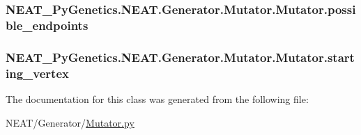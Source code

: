 \subsubsection[{\texorpdfstring{possible\+\_\+endpoints}{possible_endpoints}}]{\setlength{\rightskip}{0pt plus 5cm}N\+E\+A\+T\+\_\+\+Py\+Genetics.\+N\+E\+A\+T.\+Generator.\+Mutator.\+Mutator.\+possible\+\_\+endpoints\hspace{0.3cm}{\ttfamily [static]}}\hypertarget{classNEAT__PyGenetics_1_1NEAT_1_1Generator_1_1Mutator_1_1Mutator_add17af09898bf2a4203fed77bc404161}{}\label{classNEAT__PyGenetics_1_1NEAT_1_1Generator_1_1Mutator_1_1Mutator_add17af09898bf2a4203fed77bc404161}
\subsubsection[{\texorpdfstring{starting\+\_\+vertex}{starting_vertex}}]{\setlength{\rightskip}{0pt plus 5cm}N\+E\+A\+T\+\_\+\+Py\+Genetics.\+N\+E\+A\+T.\+Generator.\+Mutator.\+Mutator.\+starting\+\_\+vertex\hspace{0.3cm}{\ttfamily [static]}}\hypertarget{classNEAT__PyGenetics_1_1NEAT_1_1Generator_1_1Mutator_1_1Mutator_a74faa3a8d9acd9c1c0a68e145441fc5b}{}\label{classNEAT__PyGenetics_1_1NEAT_1_1Generator_1_1Mutator_1_1Mutator_a74faa3a8d9acd9c1c0a68e145441fc5b}


The documentation for this class was generated from the following file\+:\begin{DoxyCompactItemize}
\item 
N\+E\+A\+T/\+Generator/\hyperlink{Mutator_8py}{Mutator.\+py}\end{DoxyCompactItemize}
